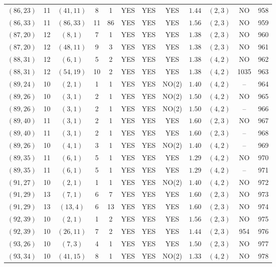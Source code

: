 \begin{longtable}{|c|c|c|c|c|c|c|c|c|c|c|c|}
$(86,23)$ & 11 & $(41,11)$ & 8 & 1 & YES & YES & YES & $1.44$ & $(2,3)$ & NO & 958\\
$(86,33)$ & 11 & $(86,33)$ & 11 & 86 & YES & YES & YES & $1.56$ & $(2,3)$ & NO & 959\\
$(87,20)$ & 12 & $(8,1)$ & 7 & 1 & YES & YES & YES & $1.38$ & $(2,3)$ & NO & 960\\
$(87,20)$ & 12 & $(48,11)$ & 9 & 3 & YES & YES & YES & $1.38$ & $(2,3)$ & NO & 961\\
$(88,31)$ & 12 & $(6,1)$ & 5 & 2 & YES & YES & YES & $1.38$ & $(4,2)$ & NO & 962\\
$(88,31)$ & 12 & $(54,19)$ & 10 & 2 & YES & YES & YES & $1.38$ & $(4,2)$ & 1035 & 963\\
$(89,24)$ & 10 & $(2,1)$ & 1 & 1 & YES & YES & NO(2) & $1.40$ & $(4,2)$ & -- & 964\\
$(89,26)$ & 10 & $(3,1)$ & 2 & 1 & YES & YES & NO(2) & $1.50$ & $(4,2)$ & NO & 965\\
$(89,26)$ & 10 & $(3,1)$ & 2 & 1 & YES & YES & NO(2) & $1.50$ & $(4,2)$ & -- & 966\\
$(89,40)$ & 11 & $(3,1)$ & 2 & 1 & YES & YES & YES & $1.60$ & $(2,3)$ & NO & 967\\
$(89,40)$ & 11 & $(3,1)$ & 2 & 1 & YES & YES & YES & $1.60$ & $(2,3)$ & -- & 968\\
$(89,26)$ & 10 & $(4,1)$ & 3 & 1 & YES & YES & NO(2) & $1.40$ & $(4,2)$ & -- & 969\\
$(89,35)$ & 11 & $(6,1)$ & 5 & 1 & YES & YES & YES & $1.29$ & $(4,2)$ & NO & 970\\
$(89,35)$ & 11 & $(6,1)$ & 5 & 1 & YES & YES & YES & $1.29$ & $(4,2)$ & -- & 971\\
$(91,27)$ & 10 & $(2,1)$ & 1 & 1 & YES & YES & NO(2) & $1.40$ & $(4,2)$ & NO & 972\\
$(91,29)$ & 13 & $(7,1)$ & 6 & 7 & YES & YES & YES & $1.60$ & $(2,3)$ & NO & 973\\
$(91,29)$ & 13 & $(13,4)$ & 6 & 13 & YES & YES & YES & $1.60$ & $(2,3)$ & NO & 974\\
$(92,39)$ & 10 & $(2,1)$ & 1 & 2 & YES & YES & YES & $1.56$ & $(2,3)$ & NO & 975\\
$(92,39)$ & 10 & $(26,11)$ & 7 & 2 & YES & YES & YES & $1.44$ & $(2,3)$ & 954 & 976\\
$(93,26)$ & 10 & $(7,3)$ & 4 & 1 & YES & YES & YES & $1.50$ & $(2,3)$ & NO & 977\\
$(93,34)$ & 10 & $(41,15)$ & 8 & 1 & YES & YES & NO(2) & $1.33$ & $(4,2)$ & NO & 978\\

\end{longtable}
